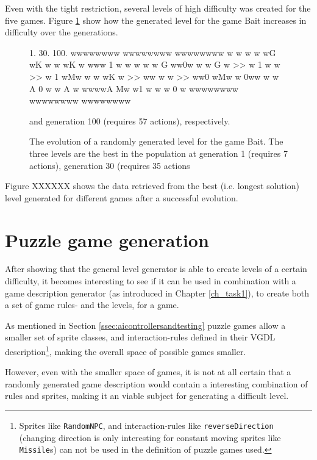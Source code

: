 \documentclass[a4paper,titlepage,final]{report}
\begin{document}
Even with the tight restriction, several levels of high difficulty was created for the five games.
Figure \ref{fig:lvlevolveprocess} show how the generated level for the game Bait increases in difficulty over the generations.


\begin{figure}[!ht]
\centering
\begin{vgdldesc}[linewidth=14cm]
1.          30.         100.
wwwwwwww    wwwwwwww    wwwwwwww
w  w w w    wG  wK w    w   wK w
www 1  w    w   w  w    w G ww0w
w w G  w >> w 1  w w >> w 1  wMw
w w wK w >> ww  w  w >> ww0  wMw
w  0ww w    w A  0 w    w A    w
wwwwA Mw    w1  w  w    w   0  w
wwwwwwww    wwwwwwww    wwwwwwww
\end{vgdldesc}
\caption{The evolution of a randomly generated level for the game Bait. The three levels are the best in the population at generation 1 (requires 7 actions), generation 30 (requires 35 actions} and generation 100 (requires 57 actions), respectively.
\label{fig:lvlevolveprocess}
\end{figure}


Figure XXXXXX shows the data retrieved from the best (i.e. longest solution) level generated for different games after a successful evolution.



\section{Puzzle game generation} 
\label{sec_task3evolvingGames}
After showing that the general level generator is able to create levels of a certain difficulty, it becomes interesting to see if it can be used in combination with a game description generator (as introduced in Chapter \ref{ch_task1}), to create both a set of game rules- and the levels, for a game.

As mentioned in Section \ref{ssec:aicontrollersandtesting} puzzle games allow a smaller set of sprite classes, and interaction-rules defined in their VGDL description\footnote{Sprites like \texttt{RandomNPC}, and interaction-rules like \texttt{reverseDirection} (changing direction is only interesting for constant moving sprites like \texttt{Missile}s) can not be used in the definition of puzzle games used.}, making the overall space of possible games smaller.

However, even with the smaller space of games, it is not at all certain that a randomly generated game description would contain a interesting combination of rules and sprites, making it an viable subject for generating a difficult level.
\end{document}
